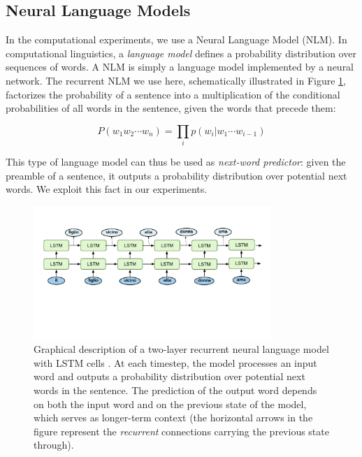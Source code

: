 \subsection{Neural Language Models}
In the computational experiments, we use a Neural Language Model (NLM).
In computational linguistics, a \emph{language model} defines a probability distribution over sequences of words. A NLM is simply a language model implemented by a neural network. The recurrent NLM we use here, schematically illustrated in Figure \ref{fig:lstm}, factorizes the probability of a sentence into a multiplication of the conditional probabilities of all words in the sentence, given the words that precede them:

\begin{equation}
    P(w_1 w_2 \cdots w_n) = \prod_i p(w_i|w_1 \cdots w_{i-1})
\end{equation}

This type of language model can thus be used as \emph{next-word predictor}: given the preamble of a sentence, it outputs a probability distribution over potential next words.
We exploit this fact in our experiments.

\begin{figure}
    \centering
    \includegraphics[width=0.8\textwidth, clip, trim={10mm 50mm 10mm 20mm}]{figures/LM-image}
    \caption{Graphical description of a two-layer recurrent neural language model with LSTM cells \citep[not discussed here; see, e.g.,][]{Goldberg:2017}. At each timestep, the model processes an input word and outputs a probability distribution over potential next words in the sentence. The prediction of the output word depends on both the input word and on the previous state of the model, which serves as longer-term context (the horizontal arrows in the figure represent the \emph{recurrent} connections carrying the previous state through).} \label{fig:lstm}
\end{figure}


